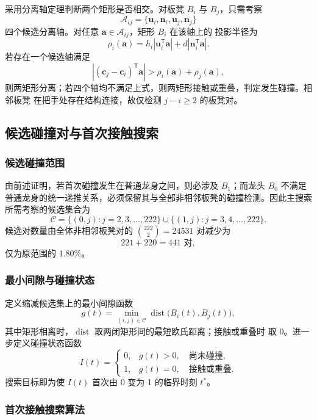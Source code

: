 \documentclass[
  11pt,
  UTF8]{ctexart}
\begin{document}
采用分离轴定理判断两个矩形是否相交。对板凳 \(B_i\) 与 \(B_j\)，只需考察
\[
\mathcal A_{ij}=\{\boldsymbol u_i,\boldsymbol n_i,
\boldsymbol u_j,\boldsymbol n_j\}
\]
四个候选分离轴。对任意 \(\boldsymbol a\in\mathcal A_{ij}\)，矩形 \(B_i\) 在该轴上的
投影半径为
\[
\rho_i(\boldsymbol a)
=h_i|\boldsymbol u_i^{\mathsf T}\boldsymbol a|
+d|\boldsymbol n_i^{\mathsf T}\boldsymbol a|.
\]
若存在一个候选轴满足
\[
\left|(\boldsymbol c_j-\boldsymbol c_i)^{\mathsf T}\boldsymbol a\right|
>\rho_i(\boldsymbol a)+\rho_j(\boldsymbol a),
\]
则两矩形分离；若四个轴均不满足上式，则两矩形接触或重叠，判定发生碰撞。相邻板凳
在把手处存在结构连接，故仅检测 \(j-i\geq2\) 的板凳对。

\subsection{候选碰撞对与首次接触搜索}

\subsubsection{候选碰撞范围}

由前述证明，若首次碰撞发生在普通龙身之间，则必涉及 \(B_1\)；而龙头 \(B_0\)
不满足普通龙身的统一递推关系，必须保留其与全部非相邻板凳的碰撞检测。因此主搜索
所需考察的候选集合为
\[
\mathcal C=\{(0,j):j=2,3,\ldots,222\}
\cup\{(1,j):j=3,4,\ldots,222\}.
\]
候选对数量由全体非相邻板凳对的
\(\binom{222}{2}=24531\) 对减少为
\[
221+220=441\text{ 对},
\]
仅为原范围的 \(1.80\%\)。

\subsubsection{最小间隙与碰撞状态}

定义缩减候选集上的最小间隙函数
\[
g(t)=\min_{(i,j)\in\mathcal C}\operatorname{dist}
\bigl(B_i(t),B_j(t)\bigr),
\]
其中矩形相离时，\(\operatorname{dist}\) 取两闭矩形间的最短欧氏距离；接触或重叠时
取 0。进一步定义碰撞状态函数
\[
I(t)=
\begin{cases}
0, & g(t)>0,\quad\text{尚未碰撞},\\
1, & g(t)=0,\quad\text{接触或重叠}.
\end{cases}
\]
搜索目标即为使 \(I(t)\) 首次由 0 变为 1 的临界时刻 \(t^*\)。

\subsubsection{首次接触搜索算法}
\end{document}
